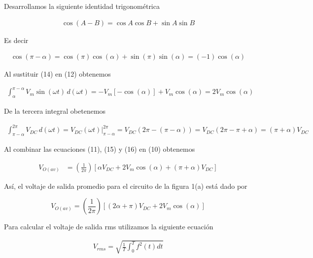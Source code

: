 \documentclass{article}
\begin{document}
\noindent Desarrollamos la siguiente identidad trigonométrica

\begin{align}
	\cos(A - B) = \cos A \cos B + \sin A \sin B
\end{align}

\noindent Es decir

\begin{align}
	\cos(\pi - \alpha) = \cos (\pi)  \cos (\alpha) + \sin(\pi) \sin (\alpha)  = (-1)\cos (\alpha)
\end{align}

\noindent Al sustituir (14) en (12) obtenemos

\begin{align}
	\int_{\alpha}^{\pi - \alpha}{V_m \sin (\omega t) \, d(\omega t) } = -V_m \left[ -\cos (\alpha) \right] + V_m \cos (\alpha) = 2V_m \cos (\alpha)
\end{align}

\noindent De la tercera integral obetenemos

\begin{align}
	\int_{\pi - \alpha}^{2\pi}{V_{DC}} \,d(\omega t) = V_{DC} (\omega t)  \bigg\rvert_{\pi - \alpha}^{2\pi} = V_{DC} \left( 2\pi - (\pi - \alpha) \right) = V_{DC} (2\pi - \pi + \alpha) = (\pi + \alpha)V_{DC}
\end{align}

\noindent Al combinar las ecuaciones (11), (15) y (16) en (10) obtenemos

\begin{align}
		V_{O(av)} &= \left( \frac{1}{2\pi} \right)  \left[ \alpha V_{DC} + 2V_m \cos (\alpha) + (\pi + \alpha)V_{DC} \right] \nonumber
\end{align}

\noindent Así, el voltaje de salida promedio para el circuito de la figura 1(a) está dado por


\begin{tcolorbox}[colback=red!5!white,colframe=red!75!black,arc=0mm,boxrule=0mm,width=(\linewidth+0.5cm)]
	\begin{equation}
	V_{O(av)} = \left( \frac{1}{2\pi} \right) \left[ (2 \alpha + \pi)V_{DC} + 2V_m \cos (\alpha) \right]
	\end{equation}
\end{tcolorbox}

\noindent Para calcular el voltaje de salida rms utilizamos la siguiente ecuación

\begin{align}
	V_{rms} = \sqrt{\frac{1}{T} \int_{0}^{T} {f^2 (t) dt}}
\end{align}
\end{document}
